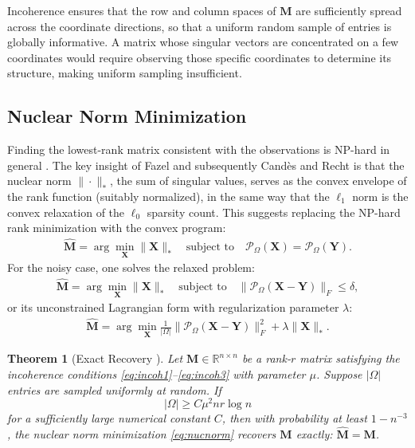 \documentclass[conference]{IEEEtran}
\newtheorem{theorem}{Theorem}
\begin{document}
Incoherence ensures that the row and column spaces of $\mathbf{M}$ are sufficiently spread across the coordinate directions, so that a uniform random sample of entries is globally informative. A matrix whose singular vectors are concentrated on a few coordinates would require observing those specific coordinates to determine its structure, making uniform sampling insufficient.

\subsection{Nuclear Norm Minimization}

Finding the lowest-rank matrix consistent with the observations is NP-hard in general \cite{recht2010guaranteed}. The key insight of Fazel \cite{fazel2002matrix} and subsequently Cand\`{e}s and Recht \cite{candes2009exact} is that the nuclear norm $\|\cdot\|_*$, the sum of singular values, serves as the convex envelope of the rank function (suitably normalized), in the same way that the $\ell_1$ norm is the convex relaxation of the $\ell_0$ sparsity count. This suggests replacing the NP-hard rank minimization with the convex program:
\begin{align}
  \hat{\mathbf{M}} = \arg\min_{\mathbf{X}} \|\mathbf{X}\|_* \quad
  \text{subject to} \quad \mathcal{P}_\Omega(\mathbf{X}) = \mathcal{P}_\Omega(\mathbf{Y}).
  \label{eq:nucnorm}
\end{align}
For the noisy case, one solves the relaxed problem:
\begin{align}
  \hat{\mathbf{M}} = \arg\min_{\mathbf{X}} \|\mathbf{X}\|_* \quad
  \text{subject to} \quad \|\mathcal{P}_\Omega(\mathbf{X} - \mathbf{Y})\|_F \leq \delta,
  \label{eq:nucnorm_noisy}
\end{align}
or its unconstrained Lagrangian form with regularization parameter $\lambda$:
\begin{align}
  \hat{\mathbf{M}} = \arg\min_{\mathbf{X}} \frac{1}{|\Omega|}\|\mathcal{P}_\Omega(\mathbf{X} - \mathbf{Y})\|_F^2 + \lambda \|\mathbf{X}\|_*.
  \label{eq:nucnorm_reg}
\end{align}

\begin{theorem}[Exact Recovery \cite{candes2009exact}]
  Let $\mathbf{M} \in \mathbb{R}^{n \times n}$ be a rank-$r$ matrix satisfying the incoherence conditions \eqref{eq:incoh1}--\eqref{eq:incoh3} with parameter $\mu$. Suppose $|\Omega|$ entries are sampled uniformly at random. If
  \begin{equation}
    |\Omega| \geq C \mu^2 n r \log n
    \label{eq:sample_bound}
  \end{equation}
  for a sufficiently large numerical constant $C$, then with probability at least $1 - n^{-3}$, the nuclear norm minimization \eqref{eq:nucnorm} recovers $\mathbf{M}$ exactly: $\hat{\mathbf{M}} = \mathbf{M}$.
\end{theorem}
\end{document}
